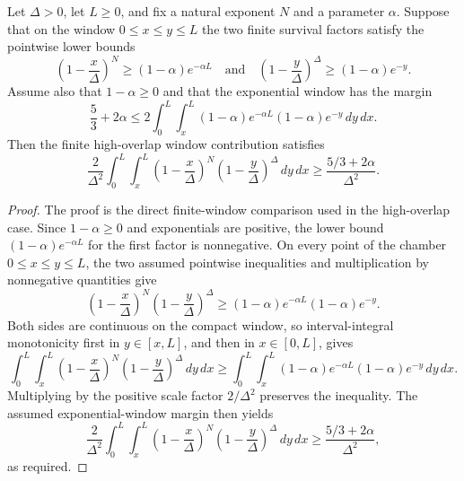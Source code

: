 \begin{helper}
Let $\Delta>0$, let $L\ge0$, and fix a natural exponent $N$ and a parameter
$\alpha$.  Suppose that on the window $0\le x\le y\le L$ the two finite
survival factors satisfy the pointwise lower bounds
\[
\left(1-\frac{x}{\Delta}\right)^N
\ge (1-\alpha)e^{-\alpha L}
\quad\text{and}\quad
\left(1-\frac{y}{\Delta}\right)^\Delta
\ge (1-\alpha)e^{-y}.
\]
Assume also that \(1-\alpha\ge0\) and that the exponential window has the
margin
\[
\frac53+2\alpha
\le
2\int_0^L\int_x^L
(1-\alpha)e^{-\alpha L}(1-\alpha)e^{-y}\,dy\,dx .
\]
Then the finite high-overlap window contribution satisfies
\[
\frac2{\Delta^2}\int_0^L\int_x^L
\left(1-\frac{x}{\Delta}\right)^N
\left(1-\frac{y}{\Delta}\right)^\Delta\,dy\,dx
\ge
\frac{5/3+2\alpha}{\Delta^2}.
\]
\end{helper}
\begin{proof}
The proof is the direct finite-window comparison used in the high-overlap
case.  Since \(1-\alpha\ge0\) and exponentials are positive, the lower bound
\((1-\alpha)e^{-\alpha L}\) for the first factor is nonnegative.  On every
point of the chamber \(0\le x\le y\le L\), the two assumed pointwise
inequalities and multiplication by nonnegative quantities give
\[
\left(1-\frac{x}{\Delta}\right)^N
\left(1-\frac{y}{\Delta}\right)^\Delta
\ge
(1-\alpha)e^{-\alpha L}(1-\alpha)e^{-y}.
\]
Both sides are continuous on the compact window, so interval-integral
monotonicity first in \(y\in[x,L]\), and then in \(x\in[0,L]\), gives
\[
\int_0^L\int_x^L
\left(1-\frac{x}{\Delta}\right)^N
\left(1-\frac{y}{\Delta}\right)^\Delta\,dy\,dx
\ge
\int_0^L\int_x^L
(1-\alpha)e^{-\alpha L}(1-\alpha)e^{-y}\,dy\,dx .
\]
Multiplying by the positive scale factor \(2/\Delta^2\) preserves the
inequality.  The assumed exponential-window margin then yields
\[
\frac2{\Delta^2}\int_0^L\int_x^L
\left(1-\frac{x}{\Delta}\right)^N
\left(1-\frac{y}{\Delta}\right)^\Delta\,dy\,dx
\ge
\frac{5/3+2\alpha}{\Delta^2},
\]
as required.
\end{proof}
